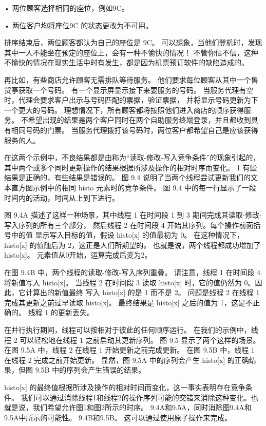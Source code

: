 • 两位顾客选择相同的座位，例如9C。

• 两位客户均将座位9C 的状态更改为不可用。

排序结束后，两位顾客都认为自己的座位是 9C。 
可以想象，当他们登机时，发现其中一人不能坐在预定的座位上，会有一种不愉快的情况！ 
不管你信不信，这种不愉快的情况在现实生活中时有发生，都是因为机票预订软件的缺陷造成的。

再比如，有些商店允许顾客无需排队等待服务。 他们要求每位顾客从其中一个售货亭获取一个号码。 
有一个显示屏显示接下来要服务的号码。 当服务代理有空时，代理会要求客户出示与号码匹配的票据，验证票据，
并将显示号码更新为下一个更大的号码。 理想情况下，所有顾客都将按照他们进入商店的顺序获得服务。 
不希望出现的结果是两个客户同时在两个自助服务终端登录，并且都收到具有相同号码的门票。 
当服务代理拨打该号码时，两位客户都希望自己是应该获得服务的人。

在这两个示例中，不良结果都是由称为“读取-修改-写入竞争条件”的现象引起的，
其中两个或多个同时更新操作的结果根据所涉及操作的相对时序而变化。 1 有些结果是正确的，有些结果是错误的。 
图 9.4 说明了当两个线程尝试更新我们的文本直方图示例中的相同 histo 元素时的竞争条件。 
图 9.4 中的每一行显示了一段时间内的活动，时间从上到下进行。

图 9.4A 描述了这样一种场景，其中线程 1 在时间段 1 到 3 期间完成其读取-修改-写入序列的所有三个部分，
然后线程 2 在时间段 4 开始其序列。每个操作前面括号中的值 显示写入目标的值，假设 histo[x] 的值最初为 0。
在这种情况下，histo[x] 的值随后为 2，这正是人们所期望的。 也就是说，两个线程都成功增加了 histo[x]。 
元素值从0开始，运算完成后变为2。

在图 9.4B 中，两个线程的读取-修改-写入序列重叠。 请注意，线程 1 在时间段 4 将新值写入 histo[x]。
当线程 2 在时间段 3 读取 histo[x] 时，它的值仍然为 0。因此，它计算出的新值最终 写入 histo[x] 的是 1 而不是 2。
问题是线程 2 在线程 1 完成其更新之前过早读取 histo[x]。 最终结果是 histo[x] 之后的值为 1，这是不正确的。 
线程 1 的更新丢失。

在并行执行期间，线程可以按相对于彼此的任何顺序运行。 在我们的示例中，线程 2 可以轻松地在线程 1 之前启动其更新序列。
图 9.5 显示了两个这样的场景。 在图 9.5A 中，线程 2 在线程 1 开始更新之前完成更新。 
在图 9.5B 中，线程 1 在线程 2 完成之前开始更新。 
显然，图 9.5A 中的序列会产生 histo[x] 的正确结果，但图 9.5B 中的序列会产生错误的结果。

histo[x] 的最终值根据所涉及操作的相对时间而变化，这一事实表明存在竞争条件。 
我们可以通过消除线程1和线程2的操作序列可能的交错来消除这种变化。也就是说，我们希望允许图1和图2所示的时序。 
9.4A和9.5A，同时消除图9.4A和9.5A中所示的可能性。 9.4B和9.5B。 这可以通过使用原子操作来完成。

